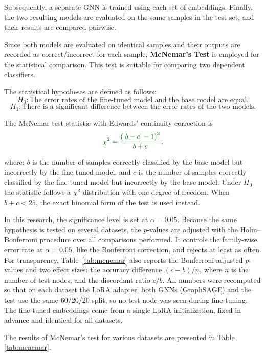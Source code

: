 \documentclass[a4paper,fleqn]{cas-sc}
\newcommand{\revthree}[1]{\textcolor{revgreen}{#1}} %
\begin{document}
Subsequently, a separate GNN is trained using each set of embeddings. Finally, the two resulting models are evaluated on the same samples in the test set, and their results are compared pairwise.

Since both models are evaluated on identical samples and their outputs are recorded as correct/incorrect for each sample, \textbf{McNemar's Test} is employed for the statistical comparison. This test is suitable for comparing two dependent classifiers.

The statistical hypotheses are defined as follows:
\[
H_0: \text{The error rates of the fine-tuned model and the base model are equal.}
\]
\[
H_1: \text{There is a significant difference between the error rates of the two models.}
\]

\revthree{The McNemar test statistic with Edwards' continuity correction is}
\begin{equation}
\revthree{\chi^2 = \frac{\left(|b - c| - 1\right)^2}{b + c},}
\label{eq:mcnemar}
\end{equation}

where:
\(b\) is the number of samples correctly classified by the base model but incorrectly by the fine-tuned model,
and \(c\) is the number of samples correctly classified by the fine-tuned model but incorrectly by the base model.
\revthree{Under $H_0$ the statistic follows a $\chi^2$ distribution with one degree of freedom. When $b+c<25$, the exact binomial form of the test is used instead.}

In this research, the significance level is set at \(\alpha = 0.05\).
\revthree{Because the same hypothesis is tested on several datasets, the $p$-values are adjusted with the Holm--Bonferroni procedure \citep{holm1979simple} over all comparisons performed. It controls the family-wise error rate at $\alpha=0.05$, like the Bonferroni correction, and rejects at least as often. For transparency, Table~\ref{tab:mcnemar} also reports the Bonferroni-adjusted $p$-values and two effect sizes: the accuracy difference $(c-b)/n$, where $n$ is the number of test nodes, and the discordant ratio $c/b$. All numbers were recomputed so that on each dataset the LoRA adapter, both GNNs (GraphSAGE) and the test use the same 60/20/20 split, so no test node was seen during fine-tuning. The fine-tuned embeddings come from a single LoRA initialization, fixed in advance and identical for all datasets.}

The results of McNemar's test for various datasets are presented in Table \ref{tab:mcnemar}.
\end{document}
